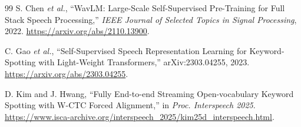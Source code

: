 \documentclass[11pt,a4paper]{article}
\begin{document}
\begin{thebibliography}{99}
S. Chen \textit{et al.}, ``WavLM: Large-Scale Self-Supervised Pre-Training for Full Stack Speech Processing,'' \textit{IEEE Journal of Selected Topics in Signal Processing}, 2022. \url{https://arxiv.org/abs/2110.13900}.

C. Gao \textit{et al.}, ``Self-Supervised Speech Representation Learning for Keyword-Spotting with Light-Weight Transformers,'' arXiv:2303.04255, 2023. \url{https://arxiv.org/abs/2303.04255}.

D. Kim and J. Hwang, ``Fully End-to-end Streaming Open-vocabulary Keyword Spotting with W-CTC Forced Alignment,'' in \textit{Proc. Interspeech 2025}. \url{https://www.isca-archive.org/interspeech_2025/kim25d_interspeech.html}.
\end{thebibliography}
\end{document}

